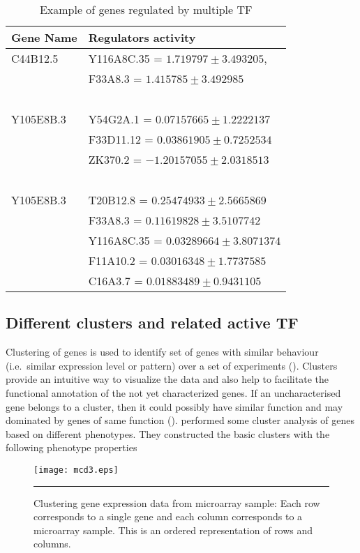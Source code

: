 \begin{table}
	\centering
\begin{tabular}{l l }
      \toprule
      \textbf{Gene Name} & \textbf{Regulators activity} \\
      \midrule
	      C44B12.5 & Y116A8C.35 = $ 1.719797 \pm 3.493205 $, \\ 
		       & F33A8.3 = $ 1.415785 \pm 3.492985$ \\~\\

	      Y105E8B.3 & Y54G2A.1 = $ 0.07157665 \pm 1.2222137 $ \\
			& F33D11.12 = $ 0.03861905 \pm 0.7252534 $ \\
			& ZK370.2 = $ -1.20157055 \pm  2.0318513 $\\~\\
		    
	      Y105E8B.3 & T20B12.8 = $ 0.25474933 \pm  2.5665869 $ \\
		  	& F33A8.3 = $ 0.11619828  \pm  3.5107742 $ \\
 		  	& Y116A8C.35 = $ 0.03289664 \pm  3.8071374 $ \\
			& F11A10.2 = $ 0.03016348 \pm 1.7737585 $ \\
 		  	& C16A3.7 = $ 0.01883489 \pm  0.9431105$\\
  \bottomrule
  \end{tabular}
	  \caption[Example of genes regulated by multiple TF]
		  {Example of genes regulated by multiple TF}
	  \label{table:Genes_regulated_by_multiple_TF}
\end{table}

\subsection{Different clusters and related active TF}
Clustering of genes is used to identify set of genes with similar behaviour (i.e.\ similar expression level or pattern) over a set of experiments (\cite{Eisen:1998}). Clusters provide an intuitive way to visualize the data and also help to facilitate the functional annotation of the not yet characterized genes. If an uncharacterised gene belongs to a cluster, then it could possibly have similar function and may dominated by genes of same function (\cite{Pe'er:2003}). \cite{Cossins:2007} performed some cluster analysis of genes based on different phenotypes. They constructed the basic clusters with the following phenotype properties

\begin{figure}
	\centering
		\texttt{[image: mcd3.eps]}
		\rule{35em}{0.5pt}
	\caption[Clustering genes from microarray sample]
		{Clustering gene expression data from microarray sample: Each row corresponds to a single gene and each column corresponds to a microarray sample. This is an ordered representation of rows and columns.}
	\label{fig:Clustering_TF}
\end{figure}

